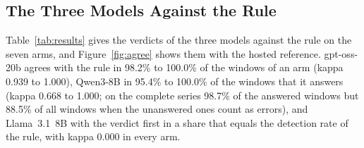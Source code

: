 \subsection{The Three Models Against the Rule}
\label{sec:results:overview}

Table~\ref{tab:results} gives the verdicts of the three models against the rule on the seven arms, and Figure~\ref{fig:agree} shows them with the hosted reference. gpt-oss-20b agrees with the rule in 98.2\% to 100.0\% of the windows of an arm (kappa 0.939 to 1.000), Qwen3-8B in 95.4\% to 100.0\% of the windows that it answers (kappa 0.668 to 1.000; on the complete series 98.7\% of the answered windows but 88.5\% of all windows when the unanswered ones count as errors), and Llama~3.1~8B with the verdict first in a share that equals the detection rate of the rule, with kappa 0.000 in every arm.


